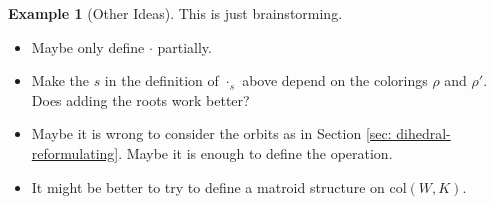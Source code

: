 \documentclass{article}
\theoremstyle{definition}
\newtheorem{example}[theorem]{Example}
\begin{document}
\begin{example}[Other Ideas] This is just brainstorming.
\begin{itemize}
\item Maybe only define $\cdot$ partially.
\item Make the $s$ in the definition of $\cdot_s$ above depend on the colorings $\rho$ and $\rho'$. Does adding the roots work better?
\item Maybe it is wrong to consider the orbits as in Section \ref{sec: dihedral-reformulating}. Maybe it is enough to define the operation.
\item It might be better to try to define a matroid structure on $\text{col}(W,K)$. 
\end{itemize}
\end{example}
\end{document}
